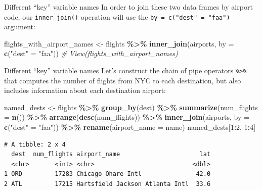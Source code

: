 \documentclass[
  ignorenonframetext,
]{beamer}
\newenvironment{Shaded}{\begin{snugshade}}{\end{snugshade}}
\newcommand{\AttributeTok}[1]{\textcolor[rgb]{0.13,0.29,0.53}{#1}}
\newcommand{\CommentTok}[1]{\textcolor[rgb]{0.56,0.35,0.01}{\textit{#1}}}
\newcommand{\DecValTok}[1]{\textcolor[rgb]{0.00,0.00,0.81}{#1}}
\newcommand{\FunctionTok}[1]{\textcolor[rgb]{0.13,0.29,0.53}{\textbf{#1}}}
\newcommand{\NormalTok}[1]{#1}
\newcommand{\OtherTok}[1]{\textcolor[rgb]{0.56,0.35,0.01}{#1}}
\newcommand{\SpecialCharTok}[1]{\textcolor[rgb]{0.81,0.36,0.00}{\textbf{#1}}}
\newcommand{\StringTok}[1]{\textcolor[rgb]{0.31,0.60,0.02}{#1}}
\begin{document}
\begin{frame}[fragile]{Different ``key'' variable names}
\protect\hypertarget{different-key-variable-names-1}{}
In order to join these two data frames by airport code, our
\texttt{inner\_join()} operation will use the
\texttt{by\ =\ c("dest"\ =\ "faa")} argument:

\normalsize

\begin{Shaded}
\begin{Highlighting}[]
\NormalTok{flights\_with\_airport\_names }\OtherTok{\textless{}{-}}\NormalTok{ flights }\SpecialCharTok{\%\textgreater{}\%} 
  \FunctionTok{inner\_join}\NormalTok{(airports, }\AttributeTok{by =} \FunctionTok{c}\NormalTok{(}\StringTok{"dest"} \OtherTok{=} \StringTok{"faa"}\NormalTok{))}
\CommentTok{\# View(flights\_with\_airport\_names)}
\end{Highlighting}
\end{Shaded}

\normalsize
\end{frame}

\begin{frame}[fragile]{Different ``key'' variable names}
\protect\hypertarget{different-key-variable-names-2}{}
Let's construct the chain of pipe operators \texttt{\%\textgreater{}\%}
that computes the number of flights from NYC to each destination, but
also includes information about each destination airport:

\normalsize

\begin{Shaded}
\begin{Highlighting}[]
\NormalTok{named\_dests }\OtherTok{\textless{}{-}}\NormalTok{ flights }\SpecialCharTok{\%\textgreater{}\%}
  \FunctionTok{group\_by}\NormalTok{(dest) }\SpecialCharTok{\%\textgreater{}\%}
  \FunctionTok{summarize}\NormalTok{(}\AttributeTok{num\_flights =} \FunctionTok{n}\NormalTok{()) }\SpecialCharTok{\%\textgreater{}\%}
  \FunctionTok{arrange}\NormalTok{(}\FunctionTok{desc}\NormalTok{(num\_flights)) }\SpecialCharTok{\%\textgreater{}\%}
  \FunctionTok{inner\_join}\NormalTok{(airports, }\AttributeTok{by =} \FunctionTok{c}\NormalTok{(}\StringTok{"dest"} \OtherTok{=} \StringTok{"faa"}\NormalTok{)) }\SpecialCharTok{\%\textgreater{}\%}
  \FunctionTok{rename}\NormalTok{(}\AttributeTok{airport\_name =}\NormalTok{ name)}
\NormalTok{named\_dests[}\DecValTok{1}\SpecialCharTok{:}\DecValTok{2}\NormalTok{, }\DecValTok{1}\SpecialCharTok{:}\DecValTok{4}\NormalTok{]}
\end{Highlighting}
\end{Shaded}

\begin{verbatim}
# A tibble: 2 x 4
  dest  num_flights airport_name                      lat
  <chr>       <int> <chr>                           <dbl>
1 ORD         17283 Chicago Ohare Intl               42.0
2 ATL         17215 Hartsfield Jackson Atlanta Intl  33.6
\end{verbatim}

\normalsize
\end{frame}
\end{document}
